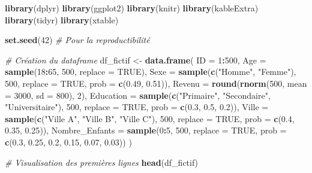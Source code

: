 \documentclass[
]{article}
\newenvironment{Shaded}{\begin{snugshade}}{\end{snugshade}}
\newcommand{\AttributeTok}[1]{\textcolor[rgb]{0.13,0.29,0.53}{#1}}
\newcommand{\CommentTok}[1]{\textcolor[rgb]{0.56,0.35,0.01}{\textit{#1}}}
\newcommand{\ConstantTok}[1]{\textcolor[rgb]{0.56,0.35,0.01}{#1}}
\newcommand{\DecValTok}[1]{\textcolor[rgb]{0.00,0.00,0.81}{#1}}
\newcommand{\FloatTok}[1]{\textcolor[rgb]{0.00,0.00,0.81}{#1}}
\newcommand{\FunctionTok}[1]{\textcolor[rgb]{0.13,0.29,0.53}{\textbf{#1}}}
\newcommand{\NormalTok}[1]{#1}
\newcommand{\OtherTok}[1]{\textcolor[rgb]{0.56,0.35,0.01}{#1}}
\newcommand{\SpecialCharTok}[1]{\textcolor[rgb]{0.81,0.36,0.00}{\textbf{#1}}}
\newcommand{\StringTok}[1]{\textcolor[rgb]{0.31,0.60,0.02}{#1}}
\begin{document}
\begin{Shaded}
\begin{Highlighting}[]
\FunctionTok{library}\NormalTok{(dplyr)}
\FunctionTok{library}\NormalTok{(ggplot2)}
\FunctionTok{library}\NormalTok{(knitr)}
\FunctionTok{library}\NormalTok{(kableExtra)}
\FunctionTok{library}\NormalTok{(tidyr)}
\FunctionTok{library}\NormalTok{(xtable)}

\FunctionTok{set.seed}\NormalTok{(}\DecValTok{42}\NormalTok{)  }\CommentTok{\# Pour la reproductibilité}

\CommentTok{\# Création du dataframe}
\NormalTok{df\_fictif }\OtherTok{\textless{}{-}} \FunctionTok{data.frame}\NormalTok{(}
  \AttributeTok{ID =} \DecValTok{1}\SpecialCharTok{:}\DecValTok{500}\NormalTok{,}
  \AttributeTok{Age =} \FunctionTok{sample}\NormalTok{(}\DecValTok{18}\SpecialCharTok{:}\DecValTok{65}\NormalTok{, }\DecValTok{500}\NormalTok{, }\AttributeTok{replace =} \ConstantTok{TRUE}\NormalTok{),}
  \AttributeTok{Sexe =} \FunctionTok{sample}\NormalTok{(}\FunctionTok{c}\NormalTok{(}\StringTok{"Homme"}\NormalTok{, }\StringTok{"Femme"}\NormalTok{), }\DecValTok{500}\NormalTok{, }\AttributeTok{replace =} \ConstantTok{TRUE}\NormalTok{, }\AttributeTok{prob =} \FunctionTok{c}\NormalTok{(}\FloatTok{0.49}\NormalTok{, }\FloatTok{0.51}\NormalTok{)),}
  \AttributeTok{Revenu =} \FunctionTok{round}\NormalTok{(}\FunctionTok{rnorm}\NormalTok{(}\DecValTok{500}\NormalTok{, }\AttributeTok{mean =} \DecValTok{3000}\NormalTok{, }\AttributeTok{sd =} \DecValTok{800}\NormalTok{), }\DecValTok{2}\NormalTok{),}
  \AttributeTok{Education =} \FunctionTok{sample}\NormalTok{(}\FunctionTok{c}\NormalTok{(}\StringTok{"Primaire"}\NormalTok{, }\StringTok{"Secondaire"}\NormalTok{, }\StringTok{"Universitaire"}\NormalTok{), }\DecValTok{500}\NormalTok{, }\AttributeTok{replace =} \ConstantTok{TRUE}\NormalTok{, }\AttributeTok{prob =} \FunctionTok{c}\NormalTok{(}\FloatTok{0.3}\NormalTok{, }\FloatTok{0.5}\NormalTok{, }\FloatTok{0.2}\NormalTok{)),}
  \AttributeTok{Ville =} \FunctionTok{sample}\NormalTok{(}\FunctionTok{c}\NormalTok{(}\StringTok{"Ville A"}\NormalTok{, }\StringTok{"Ville B"}\NormalTok{, }\StringTok{"Ville C"}\NormalTok{), }\DecValTok{500}\NormalTok{, }\AttributeTok{replace =} \ConstantTok{TRUE}\NormalTok{, }\AttributeTok{prob =} \FunctionTok{c}\NormalTok{(}\FloatTok{0.4}\NormalTok{, }\FloatTok{0.35}\NormalTok{, }\FloatTok{0.25}\NormalTok{)),}
  \AttributeTok{Nombre\_Enfants =} \FunctionTok{sample}\NormalTok{(}\DecValTok{0}\SpecialCharTok{:}\DecValTok{5}\NormalTok{, }\DecValTok{500}\NormalTok{, }\AttributeTok{replace =} \ConstantTok{TRUE}\NormalTok{, }\AttributeTok{prob =} \FunctionTok{c}\NormalTok{(}\FloatTok{0.3}\NormalTok{, }\FloatTok{0.25}\NormalTok{, }\FloatTok{0.2}\NormalTok{, }\FloatTok{0.15}\NormalTok{, }\FloatTok{0.07}\NormalTok{, }\FloatTok{0.03}\NormalTok{))}
\NormalTok{)}

\CommentTok{\# Visualisation des premières lignes}
\FunctionTok{head}\NormalTok{(df\_fictif)}
\end{Highlighting}
\end{Shaded}
\end{document}
